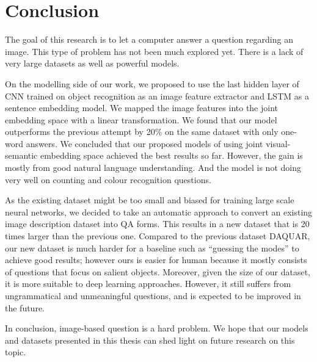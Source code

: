 \chapter{Conclusion}
The goal of this research is to let a computer answer a question regarding an image. This type of problem has not been much explored yet. There is a lack of very large datasets as well as powerful models.

On the modelling side of our work, we proposed to use the last hidden layer of CNN trained on object recognition as an image feature extractor and LSTM as a sentence embedding model. We mapped the image features into the joint embedding space with a linear transformation. We found that our model outperforms the previous attempt by 20\% on the same dataset with only one-word answers. We concluded that our proposed models of using joint visual-semantic embedding space achieved the best results so far. However, the gain is mostly from good natural language understanding. And the model is not doing very well on counting and colour recognition questions. 

As the existing dataset might be too small and biased for training large scale neural networks, we decided to take an automatic approach to convert an existing image description dataset into QA forms. This results in a new dataset that is 20 times larger than the previous one. Compared to the previous dataset DAQUAR, our new dataset is much harder for a baseline such as ``guessing the modes'' to achieve good results; however ours is easier for human because it mostly consists of questions that focus on salient objects. Moreover, given the size of our dataset, it is more suitable to deep learning approaches. However, it still suffers from ungrammatical and unmeaningful questions, and is expected to be improved in the future.


In conclusion, image-based question is a hard problem. We hope that our models and datasets presented in this thesis can shed light on future research on this topic.